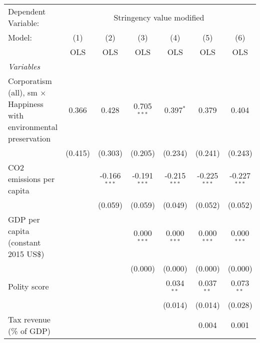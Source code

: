 
\begingroup
\centering
\begin{tabular}{lcccccc}
   \toprule
   Dependent Variable: & \multicolumn{6}{c}{Stringency value modified}\\
   Model:                                                                    & (1)     & (2)            & (3)            & (4)            & (5)            & (6)\\  
                                                                             &  OLS    & OLS            & OLS            & OLS            & OLS            & OLS\\  
   \midrule
   \emph{Variables}\\
   Corporatism (all), sm $\times$ Happiness with environmental preservation  & 0.366   & 0.428          & 0.705$^{***}$  & 0.397$^{*}$    & 0.379          & 0.404\\   
                                                                             & (0.415) & (0.303)        & (0.205)        & (0.234)        & (0.241)        & (0.243)\\   
   CO2 emissions per capita                                                  &         & -0.166$^{***}$ & -0.191$^{***}$ & -0.215$^{***}$ & -0.225$^{***}$ & -0.227$^{***}$\\   
                                                                             &         & (0.059)        & (0.059)        & (0.049)        & (0.052)        & (0.052)\\   
   GDP per capita (constant 2015 US\$)                                       &         &                & 0.000$^{***}$  & 0.000$^{***}$  & 0.000$^{***}$  & 0.000$^{***}$\\   
                                                                             &         &                & (0.000)        & (0.000)        & (0.000)        & (0.000)\\   
   Polity score                                                              &         &                &                & 0.034$^{**}$   & 0.037$^{**}$   & 0.073$^{**}$\\   
                                                                             &         &                &                & (0.014)        & (0.014)        & (0.028)\\   
   Tax revenue (\% of GDP)                                                   &         &                &                &                & 0.004          & 0.001\\   

\end{tabular}
